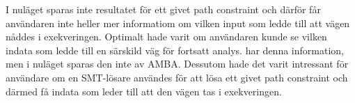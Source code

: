 I nuläget sparas inte resultatet för ett givet path constraint
och därför får användaren inte heller mer informatiom om vilken input som ledde
till att vägen nåddes i exekveringen. Optimalt hade varit om användaren kunde se
vilken indata som ledde till en särskild väg för fortsatt analys. \stoe{} har
denna information, men i nuläget sparas den inte av AMBA. Dessutom hade det
varit intressant för användare om en SMT-lösare användes för att lösa ett givet
path constraint och därmed få indata som leder till att den vägen tas i
exekveringen.
